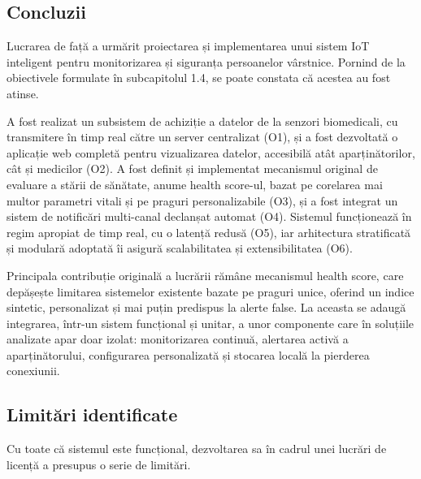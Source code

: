 \documentclass[12pt,a4paper]{article}
\begin{document}
\subsection{Concluzii}

Lucrarea de față a urmărit proiectarea și implementarea unui sistem IoT inteligent pentru monitorizarea și siguranța persoanelor vârstnice. Pornind de la obiectivele formulate în subcapitolul 1.4, se poate constata că acestea au fost atinse.

A fost realizat un subsistem de achiziție a datelor de la senzori biomedicali, cu transmitere în timp real către un server centralizat (O1), și a fost dezvoltată o aplicație web completă pentru vizualizarea datelor, accesibilă atât aparținătorilor, cât și medicilor (O2). A fost definit și implementat mecanismul original de evaluare a stării de sănătate, anume health score-ul, bazat pe corelarea mai multor parametri vitali și pe praguri personalizabile (O3), și a fost integrat un sistem de notificări multi-canal declanșat automat (O4). Sistemul funcționează în regim apropiat de timp real, cu o latență redusă (O5), iar arhitectura stratificată și modulară adoptată îi asigură scalabilitatea și extensibilitatea (O6).

Principala contribuție originală a lucrării rămâne mecanismul health score, care depășește limitarea sistemelor existente bazate pe praguri unice, oferind un indice sintetic, personalizat și mai puțin predispus la alerte false. La aceasta se adaugă integrarea, într-un sistem funcțional și unitar, a unor componente care în soluțiile analizate apar doar izolat: monitorizarea continuă, alertarea activă a aparținătorului, configurarea personalizată și stocarea locală la pierderea conexiunii.

\subsection{Limitări identificate}

Cu toate că sistemul este funcțional, dezvoltarea sa în cadrul unei lucrări de licență a presupus o serie de limitări.
\end{document}

